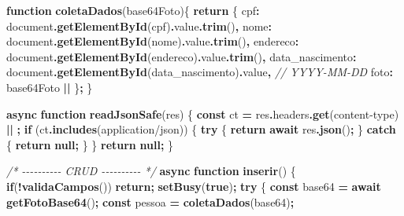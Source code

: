 \documentclass[
]{book}
\newenvironment{Shaded}{\begin{snugshade}}{\end{snugshade}}
\newcommand{\AttributeTok}[1]{\textcolor[rgb]{0.13,0.29,0.53}{#1}}
\newcommand{\BuiltInTok}[1]{#1}
\newcommand{\CommentTok}[1]{\textcolor[rgb]{0.56,0.35,0.01}{\textit{#1}}}
\newcommand{\ControlFlowTok}[1]{\textcolor[rgb]{0.13,0.29,0.53}{\textbf{#1}}}
\newcommand{\DataTypeTok}[1]{\textcolor[rgb]{0.13,0.29,0.53}{#1}}
\newcommand{\FunctionTok}[1]{\textcolor[rgb]{0.13,0.29,0.53}{\textbf{#1}}}
\newcommand{\KeywordTok}[1]{\textcolor[rgb]{0.13,0.29,0.53}{\textbf{#1}}}
\newcommand{\NormalTok}[1]{#1}
\newcommand{\OperatorTok}[1]{\textcolor[rgb]{0.81,0.36,0.00}{\textbf{#1}}}
\newcommand{\StringTok}[1]{\textcolor[rgb]{0.31,0.60,0.02}{#1}}
\begin{document}
\begin{Shaded}
\begin{Highlighting}[]
\KeywordTok{function} \FunctionTok{coletaDados}\NormalTok{(base64Foto)\{}
  \ControlFlowTok{return}\NormalTok{ \{}
    \DataTypeTok{cpf}\OperatorTok{:} \BuiltInTok{document}\OperatorTok{.}\FunctionTok{getElementById}\NormalTok{(}\StringTok{\textquotesingle{}cpf\textquotesingle{}}\NormalTok{)}\OperatorTok{.}\AttributeTok{value}\OperatorTok{.}\FunctionTok{trim}\NormalTok{()}\OperatorTok{,}
    \DataTypeTok{nome}\OperatorTok{:} \BuiltInTok{document}\OperatorTok{.}\FunctionTok{getElementById}\NormalTok{(}\StringTok{\textquotesingle{}nome\textquotesingle{}}\NormalTok{)}\OperatorTok{.}\AttributeTok{value}\OperatorTok{.}\FunctionTok{trim}\NormalTok{()}\OperatorTok{,}
    \DataTypeTok{endereco}\OperatorTok{:} \BuiltInTok{document}\OperatorTok{.}\FunctionTok{getElementById}\NormalTok{(}\StringTok{\textquotesingle{}endereco\textquotesingle{}}\NormalTok{)}\OperatorTok{.}\AttributeTok{value}\OperatorTok{.}\FunctionTok{trim}\NormalTok{()}\OperatorTok{,}
    \DataTypeTok{data\_nascimento}\OperatorTok{:} \BuiltInTok{document}\OperatorTok{.}\FunctionTok{getElementById}\NormalTok{(}\StringTok{\textquotesingle{}data\_nascimento\textquotesingle{}}\NormalTok{)}\OperatorTok{.}\AttributeTok{value}\OperatorTok{,} \CommentTok{// YYYY{-}MM{-}DD}
    \DataTypeTok{foto}\OperatorTok{:}\NormalTok{ base64Foto }\OperatorTok{||} \StringTok{\textquotesingle{}\textquotesingle{}}
\NormalTok{  \}}\OperatorTok{;}
\NormalTok{\}}

\KeywordTok{async} \KeywordTok{function} \FunctionTok{readJsonSafe}\NormalTok{(res) \{}
  \KeywordTok{const}\NormalTok{ ct }\OperatorTok{=}\NormalTok{ res}\OperatorTok{.}\AttributeTok{headers}\OperatorTok{.}\FunctionTok{get}\NormalTok{(}\StringTok{\textquotesingle{}content{-}type\textquotesingle{}}\NormalTok{) }\OperatorTok{||} \StringTok{\textquotesingle{}\textquotesingle{}}\OperatorTok{;}
  \ControlFlowTok{if}\NormalTok{ (ct}\OperatorTok{.}\FunctionTok{includes}\NormalTok{(}\StringTok{\textquotesingle{}application/json\textquotesingle{}}\NormalTok{)) \{}
    \ControlFlowTok{try}\NormalTok{ \{ }\ControlFlowTok{return} \ControlFlowTok{await}\NormalTok{ res}\OperatorTok{.}\FunctionTok{json}\NormalTok{()}\OperatorTok{;}\NormalTok{ \} }\ControlFlowTok{catch}\NormalTok{ \{ }\ControlFlowTok{return} \KeywordTok{null}\OperatorTok{;}\NormalTok{ \}}
\NormalTok{  \}}
  \ControlFlowTok{return} \KeywordTok{null}\OperatorTok{;}
\NormalTok{\}}

\CommentTok{/* {-}{-}{-}{-}{-}{-}{-}{-}{-}{-} CRUD {-}{-}{-}{-}{-}{-}{-}{-}{-}{-} */}
\KeywordTok{async} \KeywordTok{function} \FunctionTok{inserir}\NormalTok{() \{}
  \ControlFlowTok{if}\NormalTok{(}\OperatorTok{!}\FunctionTok{validaCampos}\NormalTok{()) }\ControlFlowTok{return}\OperatorTok{;}
  \FunctionTok{setBusy}\NormalTok{(}\KeywordTok{true}\NormalTok{)}\OperatorTok{;}
  \ControlFlowTok{try}\NormalTok{ \{}
    \KeywordTok{const}\NormalTok{ base64 }\OperatorTok{=} \ControlFlowTok{await} \FunctionTok{getFotoBase64}\NormalTok{()}\OperatorTok{;}
    \KeywordTok{const}\NormalTok{ pessoa }\OperatorTok{=} \FunctionTok{coletaDados}\NormalTok{(base64)}\OperatorTok{;}


\end{Highlighting}
\end{Shaded}
\end{document}
